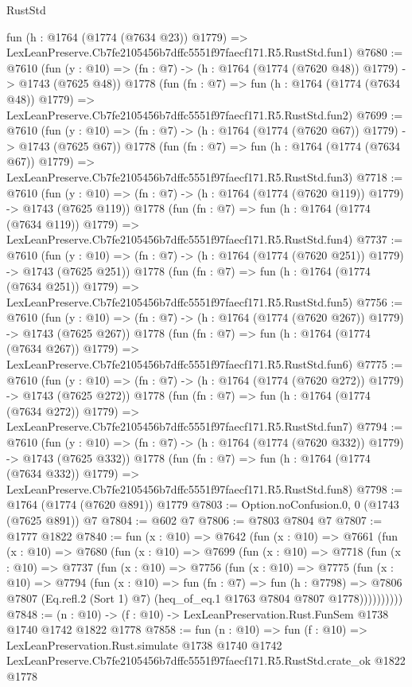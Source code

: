 \begin{lexlean}{RustStd}
\begin{coremodule}
    fun (h : @1764 (@1774 (@7634 @23)) @1779) =>
    LexLeanPreserve.Cb7fe2105456b7dffc5551f97faecf171.R5.RustStd.fun1)
@7680 := @7610
    (fun (y : @10) => (fn : @7) -> (h : @1764 (@1774 (@7620 @48)) @1779) -> @1743 (@7625 @48))
    @1778
    (fun (fn : @7) =>
    fun (h : @1764 (@1774 (@7634 @48)) @1779) =>
    LexLeanPreserve.Cb7fe2105456b7dffc5551f97faecf171.R5.RustStd.fun2)
@7699 := @7610
    (fun (y : @10) => (fn : @7) -> (h : @1764 (@1774 (@7620 @67)) @1779) -> @1743 (@7625 @67))
    @1778
    (fun (fn : @7) =>
    fun (h : @1764 (@1774 (@7634 @67)) @1779) =>
    LexLeanPreserve.Cb7fe2105456b7dffc5551f97faecf171.R5.RustStd.fun3)
@7718 := @7610
    (fun (y : @10) => (fn : @7) -> (h : @1764 (@1774 (@7620 @119)) @1779) -> @1743 (@7625 @119))
    @1778
    (fun (fn : @7) =>
    fun (h : @1764 (@1774 (@7634 @119)) @1779) =>
    LexLeanPreserve.Cb7fe2105456b7dffc5551f97faecf171.R5.RustStd.fun4)
@7737 := @7610
    (fun (y : @10) => (fn : @7) -> (h : @1764 (@1774 (@7620 @251)) @1779) -> @1743 (@7625 @251))
    @1778
    (fun (fn : @7) =>
    fun (h : @1764 (@1774 (@7634 @251)) @1779) =>
    LexLeanPreserve.Cb7fe2105456b7dffc5551f97faecf171.R5.RustStd.fun5)
@7756 := @7610
    (fun (y : @10) => (fn : @7) -> (h : @1764 (@1774 (@7620 @267)) @1779) -> @1743 (@7625 @267))
    @1778
    (fun (fn : @7) =>
    fun (h : @1764 (@1774 (@7634 @267)) @1779) =>
    LexLeanPreserve.Cb7fe2105456b7dffc5551f97faecf171.R5.RustStd.fun6)
@7775 := @7610
    (fun (y : @10) => (fn : @7) -> (h : @1764 (@1774 (@7620 @272)) @1779) -> @1743 (@7625 @272))
    @1778
    (fun (fn : @7) =>
    fun (h : @1764 (@1774 (@7634 @272)) @1779) =>
    LexLeanPreserve.Cb7fe2105456b7dffc5551f97faecf171.R5.RustStd.fun7)
@7794 := @7610
    (fun (y : @10) => (fn : @7) -> (h : @1764 (@1774 (@7620 @332)) @1779) -> @1743 (@7625 @332))
    @1778
    (fun (fn : @7) =>
    fun (h : @1764 (@1774 (@7634 @332)) @1779) =>
    LexLeanPreserve.Cb7fe2105456b7dffc5551f97faecf171.R5.RustStd.fun8)
@7798 := @1764 (@1774 (@7620 @891)) @1779
@7803 := Option.noConfusion.{0, 0} (@1743 (@7625 @891)) @7
@7804 := @602 @7
@7806 := @7803 @7804 @7
@7807 := @1777 @1822
@7840 := fun (x : @10) =>
  @7642
    (fun (x : @10) =>
    @7661
      (fun (x : @10) =>
      @7680
        (fun (x : @10) =>
        @7699
          (fun (x : @10) =>
          @7718
            (fun (x : @10) =>
            @7737
              (fun (x : @10) =>
              @7756
                (fun (x : @10) =>
                @7775
                  (fun (x : @10) =>
                  @7794
                    (fun (x : @10) =>
                    fun (fn : @7) =>
                    fun (h : @7798) =>
                    @7806
                      @7807
                      (Eq.refl.{2} (Sort 1) @7)
                      (heq_of_eq.{1} @1763 @7804 @7807 @1778))))))))))
@7848 := (n : @10) -> (f : @10) -> LexLeanPreservation.Rust.FunSem @1738 @1740 @1742 @1822 @1778
@7858 := fun (n : @10) =>
  fun (f : @10) =>
  LexLeanPreservation.Rust.simulate
    @1738
    @1740
    @1742
    LexLeanPreserve.Cb7fe2105456b7dffc5551f97faecf171.R5.RustStd.crate_ok
    @1822
    @1778
\end{coremodule}
\end{lexlean}
